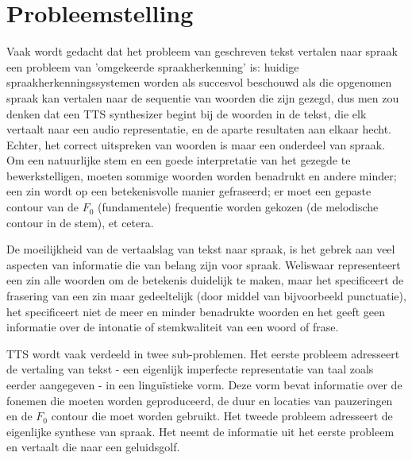 \section{Probleemstelling}

Vaak wordt gedacht dat het probleem van geschreven tekst vertalen naar spraak een probleem van 'omgekeerde spraakherkenning' is: huidige spraakherkenningssystemen worden als succesvol beschouwd als die opgenomen spraak kan vertalen naar de sequentie van woorden die zijn gezegd, dus men zou denken dat een TTS synthesizer begint bij de woorden in de tekst, die elk vertaalt naar een audio representatie, en de aparte resultaten aan elkaar hecht. Echter, het correct uitspreken van woorden is maar een onderdeel van spraak. Om een natuurlijke stem en een goede interpretatie van het gezegde te bewerkstelligen, moeten sommige woorden worden benadrukt en andere minder; een zin wordt op een betekenisvolle manier gefraseerd; er moet een gepaste contour van de $F_0$ (fundamentele) frequentie worden gekozen (de melodische contour in de stem), et cetera.

De moeilijkheid van de vertaalslag van tekst naar spraak, is het gebrek aan veel aspecten van informatie die van belang zijn voor spraak. Weliswaar representeert een zin alle woorden om de betekenis duidelijk te maken, maar het specificeert de frasering van een zin maar gedeeltelijk (door middel van bijvoorbeeld punctuatie), het specificeert niet de meer en minder benadrukte woorden en het geeft geen informatie over de intonatie of stemkwaliteit van een woord of frase.

TTS wordt vaak verdeeld in twee sub-problemen. Het eerste probleem adresseert de vertaling van tekst - een eigenlijk imperfecte representatie van taal zoals eerder aangegeven - in een linguïstieke vorm. Deze vorm bevat informatie over de fonemen die moeten worden geproduceerd, de duur en locaties van pauzeringen en de $F_0$ contour die moet worden gebruikt. Het tweede probleem adresseert de eigenlijke synthese van spraak. Het neemt de informatie uit het eerste probleem en vertaalt die naar een geluidsgolf.

